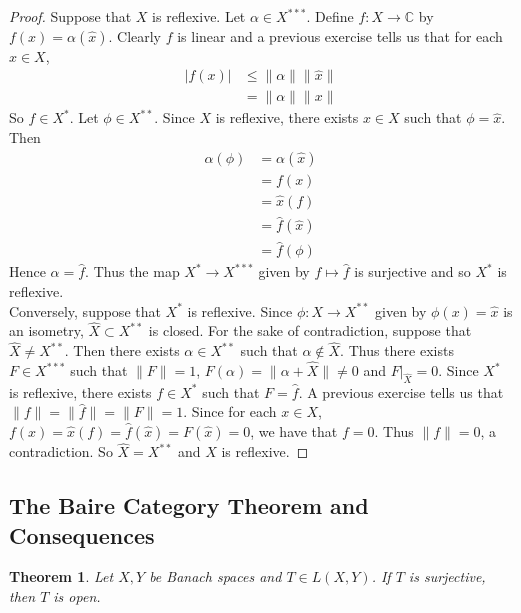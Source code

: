 \documentclass[12pt]{amsart}
\newtheorem{thm}{Theorem}[subsection]
\newcommand{\al}{\alpha}
\newcommand{\C}{\mathbb{C}}
\begin{document}
	\begin{proof}
		Suppose that $X$ is reflexive. Let $\al \in X^{***}$. Define $f :X \rightarrow \C$ by $f(x) = \al(\hat{x})$. Clearly $f$ is linear and a previous exercise tells us that for each $x \in X$, 
		\begin{align*}
			\vert f(x) \vert 
			& \leq \|\al \|\|\hat{x} \|\\
			&= \|\al \|\|x \|
		\end{align*}
		So $f \in X^*$.
		Let $\phi \in X^{**}$. Since $X$ is reflexive, there exists $x \in X$ such that $\phi = \hat{x}$. Then 
		\begin{align*}
			\al(\phi)
			&= \al(\hat{x})\\
			&= f(x)\\
			&= \hat{x}(f)\\
			&= \hat{f}(\hat{x})\\
			&= \hat{f}(\phi)
		\end{align*}
		Hence $\al = \hat{f}$. Thus the map $X^* \rightarrow X^{***}$ given by $f \mapsto \hat{f} $ is surjective and so $X^{*}$ is reflexive.\vspace{.5cm}\\
		Conversely, suppose that $X^*$ is reflexive. Since $\phi:X \rightarrow X^{**}$ given by $\phi(x) = \hat{x}$ is an isometry, $\widehat{X} \subset X^{**}$ is closed. For the sake of contradiction, suppose that $\widehat{X} \neq X^{**}$. Then there exists $\al \in X^{**}$ such that $\al \not \in \widehat{X}$. Thus there exists $F \in X^{***}$ such that $\|F \|= 1$, $F(\al) = \|\al + \widehat{X} \|\neq 0$ and $F|_{\widehat{X}}=0$. Since $X^*$ is reflexive, there exists $f \in X^*$ such that $F = \hat{f}$. A previous exercise tells us that $\|f \|= \|\hat{f} \|= \|F \|= 1$. Since for each $x \in X$, $f(x) = \hat{x}(f) = \hat{f}(\hat{x}) = F(\hat{x}) = 0$, we have that $f = 0$. Thus $\|f \|= 0$, a contradiction. So $\widehat{X} = X^{**}$ and $X$ is reflexive.
		
	\end{proof}
	
	\subsection{The Baire Category Theorem and Consequences}
	
	\begin{thm}
		Let $X, Y$ be Banach spaces and $T\in L(X,Y)$. If $T$ is surjective, then $T$ is open.
	\end{thm}
	
\end{document}
